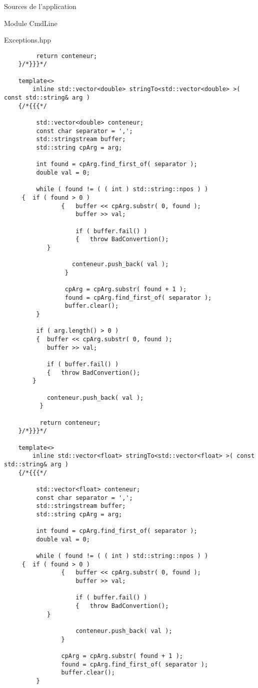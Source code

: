 \documentclass{article}
\begin{document}
\begin{section}{Sources de l'application}
\begin{subsection}{Module CmdLine}
\begin{paragraph}{Exceptions.hpp}
\begin{verbatim}
         return conteneur;
    }/*}}}*/

    template<>
        inline std::vector<double> stringTo<std::vector<double> >( const std::string& arg )
    {/*{{{*/

         std::vector<double> conteneur;
         const char separator = ',';
         std::stringstream buffer;
         std::string cpArg = arg;

         int found = cpArg.find_first_of( separator );
         double val = 0;

         while ( found != ( ( int ) std::string::npos ) )
	 {	if ( found > 0 )
                {	buffer << cpArg.substr( 0, found );
                 	buffer >> val;
                   
                   	if ( buffer.fail() )
                   	{	throw BadConvertion(); 
			}

                   conteneur.push_back( val );
    	         }

              	 cpArg = cpArg.substr( found + 1 );
              	 found = cpArg.find_first_of( separator );
              	 buffer.clear();
         }

         if ( arg.length() > 0 ) 
         {	buffer << cpArg.substr( 0, found );
           	buffer >> val;

         	if ( buffer.fail() )
           	{	throw BadConvertion();
		}
           
           	conteneur.push_back( val );
          }

          return conteneur;
    }/*}}}*/
    
    template<>
        inline std::vector<float> stringTo<std::vector<float> >( const std::string& arg )
    {/*{{{*/

         std::vector<float> conteneur;
         const char separator = ',';
         std::stringstream buffer;
         std::string cpArg = arg;

         int found = cpArg.find_first_of( separator );
         double val = 0;

         while ( found != ( ( int ) std::string::npos ) ) 
	 {	if ( found > 0 ) 
                {	buffer << cpArg.substr( 0, found );
                   	buffer >> val;
                   
                   	if ( buffer.fail() )
                   	{	throw BadConvertion();
			}

                   	conteneur.push_back( val );
              	}

              	cpArg = cpArg.substr( found + 1 );
              	found = cpArg.find_first_of( separator );
              	buffer.clear();
         }


\end{verbatim}
\end{paragraph}
\end{subsection}
\end{section}
\end{document}
